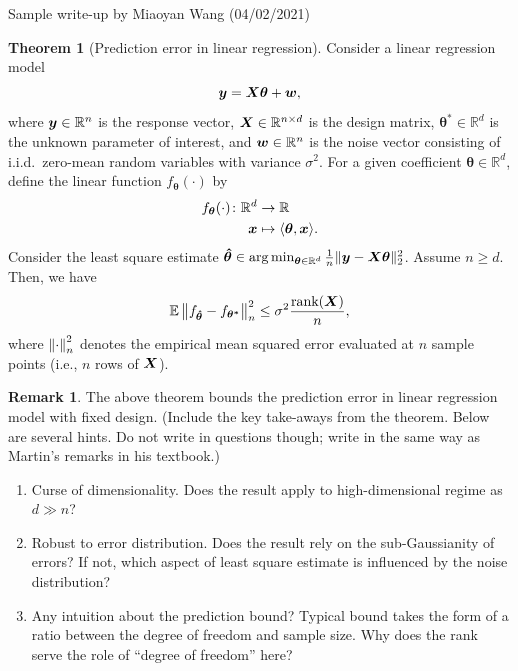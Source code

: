 \documentclass[10pt]{article}
\theoremstyle{definition}
\newtheorem{thm}{Theorem}[section]
\theoremstyle{definition}
\newtheorem{rmk}{Remark}
\theoremstyle{definition}
\begin{document}
Sample write-up by Miaoyan Wang (04/02/2021)
\vspace{.5cm}
\begin{thm}[Prediction error in linear regression]
Consider a linear regression model
\[
\bm{y}=\bm X\boldsymbol{\theta}+\bm{w},
\]
where $\bm{y}\in\mathbb{R}^n$ is the response vector, $\bm X\in\mathbb{R}^{n\times d}$ is the design matrix, $\boldsymbol{\theta}^*\in\mathbb{R}^{d}$ is the unknown parameter of interest, and $\bm{w}\in\mathbb{R}^n$ is the noise vector consisting of i.i.d.\ zero-mean random variables with variance $\sigma^2$. For a given coefficient $\boldsymbol{\theta}\in\mathbb{R}^d$, define the linear function $f_{\boldsymbol{\theta}}(\cdot)$ by
\begin{align}
f_{\boldsymbol{\theta}}(\cdot)\colon \mathbb{R}^d&\to \mathbb{R} \\
\bm x &\mapsto \langle \boldsymbol{\theta}, \bm x \rangle.
\end{align}
Consider the least square estimate $\boldsymbol{\hat \theta} \in \arg\min_{\boldsymbol{\theta}\in\mathbb{R}^d}{1\over n}\lVert\bm{y}-\bm X\boldsymbol{\theta}\rVert_2^2$. Assume $n\geq d$. Then, we have
\[
\mathbb{E}\left\lVert f_{\boldsymbol{\hat \theta}}-f_{\boldsymbol{\theta^*}}\right\rVert^2_n\leq \sigma^2 {\text{rank}(\bm X)\over n},
\]
where $\left\lVert\cdot\right\rVert^2_n$ denotes the empirical mean squared error evaluated at $n$ sample points (i.e., $n$ rows of $\bm X$).\\
\end{thm}

\begin{rmk} The above theorem bounds the prediction error in linear regression model with fixed design. (Include the key take-aways from the theorem. Below are several hints. Do not write in questions though; write in the same way as Martin's remarks in his textbook.)
\begin{enumerate}
\item Curse of dimensionality. Does the result apply to high-dimensional regime as $d\gg n$? 
\item Robust to error distribution. Does the result rely on the sub-Gaussianity of errors? If not, which aspect of least square estimate is influenced by the noise distribution?
\item Any intuition about the prediction bound? Typical bound takes the form of a ratio between the degree of freedom and sample size. Why does the rank serve the role of ``degree of freedom'' here? 
\end{enumerate}

\end{rmk}
\end{document}

